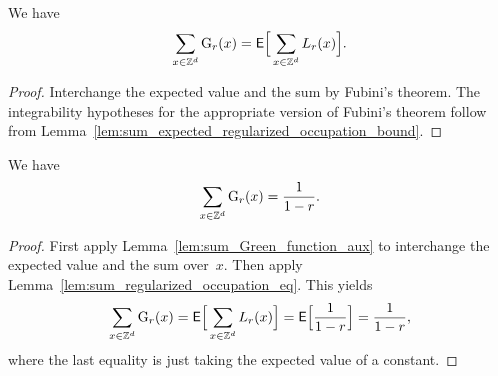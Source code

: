 \begin{lemma}
  \label{lem:sum_Green_function_aux}
  We have
  \begin{align*}
  \sum_{x \in \mathbb{Z}^d} \mathrm{G}_{r}(x) = \mathsf{E} \Big[ \sum_{x \in \mathbb{Z}^d} L_r(x) \Big] .
  \end{align*}
\end{lemma}
\begin{proof}
Interchange the expected value and the sum by Fubini's theorem.
The integrability hypotheses for the appropriate version of Fubini's theorem
follow from Lemma~\ref{lem:sum_expected_regularized_occupation_bound}.
\end{proof}

\begin{lemma}
  \label{lem:sum_Green_function}
  We have
  \begin{align*}
  \sum_{x \in \mathbb{Z}^d} \mathrm{G}_{r}(x) = \frac{1}{1-r} .
  \end{align*}
\end{lemma}
\begin{proof}
First apply Lemma~\ref{lem:sum_Green_function_aux} to interchange the expected value
and the sum over~$x$. Then apply Lemma~\ref{lem:sum_regularized_occupation_eq}.
This yields
\begin{align*}
\sum_{x \in \mathbb{Z}^d} \mathrm{G}_{r}(x) = \mathsf{E} \Big[ \sum_{x \in \mathbb{Z}^d} L_r(x) \Big]
  = \mathsf{E} \Big[ \frac{1}{1-r} \Big] = \frac{1}{1-r} ,
\end{align*}
where the last equality is just taking the expected value of a constant.
\end{proof}


